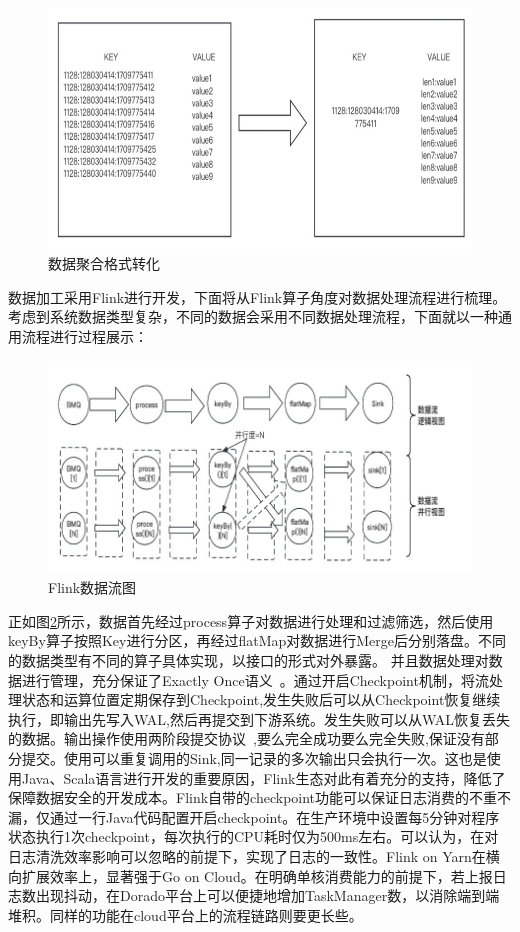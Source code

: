        \begin{figure}[htb]
  \centering
  \includegraphics[width=5in]{figure/chapter4/数据聚合格式转化.jpg}
  \caption{数据聚合格式转化}\label{shujujuhegeshi}
\end{figure}

数据加工采用Flink进行开发，下面将从Flink算子角度对数据处理流程进行梳理。考虑到系统数据类型复杂，不同的数据会采用不同数据处理流程，下面就以一种通用流程进行过程展示：

        \begin{figure}[htb]
  \centering
  \includegraphics[width=5in]{figure/chapter4/Flink数据流图.jpg}
  \caption{Flink数据流图}\label{flinkshujuliutu}
\end{figure}

正如图\ref{flinkshujuliutu}所示，数据首先经过process算子对数据进行处理和过滤筛选，然后使用keyBy算子按照Key进行分区，再经过flatMap对数据进行Merge后分别落盘。不同的数据类型有不同的算子具体实现，以接口的形式对外暴露。
并且数据处理对数据进行管理，充分保证了Exactly Once语义~\cite{patel2014towards}。通过开启Checkpoint机制，将流处理状态和运算位置定期保存到Checkpoint,发生失败后可以从Checkpoint恢复继续执行，即输出先写入WAL,然后再提交到下游系统。发生失败可以从WAL恢复丢失的数据。输出操作使用两阶段提交协议~\cite{许海洋2011分布式事务两阶段提交协议的实现方法研究},要么完全成功要么完全失败,保证没有部分提交。使用可以重复调用的Sink,同一记录的多次输出只会执行一次。这也是使用Java、Scala语言进行开发的重要原因，Flink生态对此有着充分的支持，降低了保障数据安全的开发成本。Flink自带的checkpoint功能可以保证日志消费的不重不漏，仅通过一行Java代码配置开启checkpoint。在生产环境中设置每5分钟对程序状态执行1次checkpoint，每次执行的CPU耗时仅为500ms左右。可以认为，在对日志清洗效率影响可以忽略的前提下，实现了日志的一致性。Flink on Yarn在横向扩展效率上，显著强于Go on Cloud。在明确单核消费能力的前提下，若上报日志数出现抖动，在Dorado平台上可以便捷地增加TaskManager数，以消除端到端堆积。同样的功能在cloud平台上的流程链路则要更长些。

